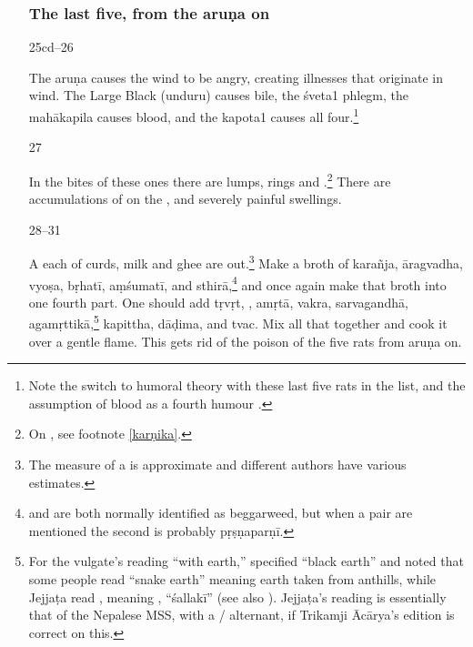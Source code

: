 \begin{translation}
\begin{itemize}
\subsubsection{The last five, from the \Gls{aruṇa} on}
\item[25cd--26]

The \Gls{aruṇa} causes the wind to be angry, creating illnesses that
originate in wind. The Large Black (\gls{unduru}) causes bile, the
\Gls{śveta1} phlegm, the \Gls{mahākapila} causes blood, and the
\Gls{kapota1} causes all four.\footnote{Note the switch to humoral
    theory with these last five rats in the list, and the assumption of blood as a 
    fourth humour .}

\item[27]

In the bites of these ones there are lumps, rings and
.\footnote{On , see footnote
    \ref{karṇika}.}  There are accumulations of  on the 
    , and severely painful swellings.

\item[28--31]    
    
A  each of curds, milk and ghee are
 out.\footnote{The measure of a  is
    approximate and different authors have various estimates.} Make a
    broth of \gls{karañja}, \gls{āragvadha}, \gls{vyoṣa}, \gls{bṛhatī},
    \gls{aṃśumatī}, and \gls{sthirā},\footnote{ and
         are both normally identified as beggarweed, but when a
        pair are mentioned the second is probably \gls{pṛṣṇaparṇī}.} and once
    again make that broth into one fourth part. %
    One should add    \gls{tṛvṛt}, , \gls{amṛtā},
    \gls{vakra}, \gls{sarvagandhā}, \gls{agamṛttikā},\footnote{For the
        vulgate's reading  “with earth,” 
        specified “black earth” and noted that some people read
         “snake earth” meaning earth taken from anthills,
        while Jejjaṭa read , meaning ,
        “\gls{śallakī}”  (see also \cite[392]{gvdb}). Jejjaṭa's reading is
        essentially that of the Nepalese MSS, with a /
        alternant, if Trikamji Ācārya's edition is correct on this.} %
        \gls{kapittha}, \gls{dāḍima}, and \gls{tvac}. Mix all that together
        and cook it over a gentle flame.
This gets rid of the poison of the five rats from \Gls{aruṇa} on.


\end{itemize}
\end{translation}
